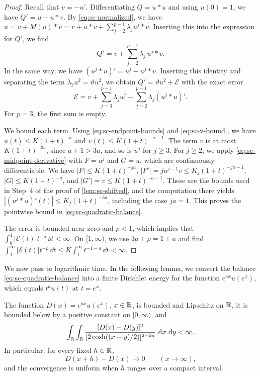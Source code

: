\begin{proof}
Recall that $v=-u'$. Differentiating $Q=u*u$ and using $u(0)=1$, we have $Q'=u-u*v$. By \eqref{eq:sc-normalized}, we have $u=v+M(u)*v=v+u*v+\sum_{j=2}^{p-1}\lambda_ju^j*v$. Inserting this into the expression for $Q'$, we find
\[
 Q'=v+\sum_{j=2}^{p-1}\lambda_j\,u^j*v .
\]
In the same way, we have $(u^j*u)'=u^j-u^j*v$. Inserting this identity and separating the term $\lambda_2u^2=\vartheta u^2$, we obtain $Q'=\vartheta u^2+\mathcal E$ with the exact error
\begin{equation}
 \mathcal E=v+\sum_{j=3}^{p-1}\lambda_ju^j
               -\sum_{j=2}^{p-1}\lambda_j(u^j*u)'.
 \label{eq:sc-error-exact}
\end{equation}
For $p=3$, the first sum is empty.

We bound each term. Using \eqref{eq:sc-endpoint-bounds} and \eqref{eq:sc-v-bound}, we have $u(t)\le K(1+t)^{-a}$ and $v(t)\le K(1+t)^{-a-1}$. The term $v$ is at most $K(1+t)^{-3a}$, since $a+1>3a$, and so is $u^j$ for $j\ge3$. For $j\ge2$, we apply \eqref{eq:sc-midpoint-derivative} with $F=u^j$ and $G=u$, which are continuously differentiable. We have $|F|\le K(1+t)^{-ja}$, $|F'|=ju^{j-1}v\le K_j(1+t)^{-ja-1}$, $|G|\le K(1+t)^{-a}$, and $|G'|=v\le K(1+t)^{-a-1}$. These are the bounds used in Step~4 of the proof of \cref{lem:sc-shifted}, and the computation there yields $|(u^j*u)'(t)|\le K_j(1+t)^{-3a}$, including the case $ja=1$. This proves the pointwise bound in \eqref{eq:sc-quadratic-balance}.

The error is bounded near zero and $\rho<1$, which implies that $\int_0^1|\mathcal E(t)|t^{-\rho}\,\dd t<\infty$. On $[1,\infty)$, we use $3a+\rho=1+a$ and find $\int_1^\infty|\mathcal E(t)|t^{-\rho}\,\dd t\le K\int_1^\infty t^{-1-a}\,\dd t<\infty$.
\end{proof}

We now pass to logarithmic time. In the following lemma, we convert the balance \eqref{eq:sc-quadratic-balance} into a finite Dirichlet energy for the function $e^{ax}u(e^x)$, which equals $t^au(t)$ at $t=e^x$.

\begin{lemma}
\label{lem:stationary-critical-dirichlet}
The function $D(x)=e^{ax}u(e^x)$, $x\in\mathbb R$, is bounded and Lipschitz on $\mathbb R$, it is bounded below by a positive constant on $[0,\infty)$, and
\begin{equation}
 \int_{\mathbb R}\int_{\mathbb R}
 \frac{[D(x)-D(y)]^2}{[2\cosh((x-y)/2)]^{2-2a}}
       \,\mathop{}\!\mathrm d x\,\mathop{}\!\mathrm d y<\infty.
 \label{eq:stationary-log-dirichlet-finite}
\end{equation}
In particular, for every fixed $h\in\mathbb R$,
\begin{equation}
 D(x+h)-D(x)\longrightarrow0\qquad(x\to\infty),
 \label{eq:stationary-log-increment-vanishing}
\end{equation}
and the convergence is uniform when $h$ ranges over a compact interval.
\end{lemma}

